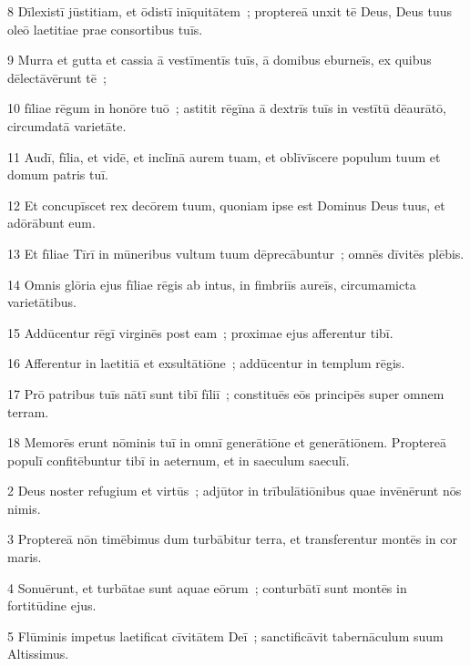 \psalmVerse
  {\phantom{00}8}
  {Dīlexistī jūstitiam, et ōdistī inīquitātem~; proptereā unxit tē Deus, Deus tuus oleō laetitiae prae consortibus tuīs.}


\psalmVerse
  {\phantom{00}9}
  {Murra et gutta et cassia ā vestīmentīs tuīs, ā domibus eburneīs, ex quibus dēlectāvērunt tē~;}


\psalmVerse
  {\phantom{0}10}
  {fīliae rēgum in honōre tuō~; astitit rēgīna ā dextrīs tuīs in vestītū dēaurātō, circumdatā varietāte.}


\psalmVerse
  {\phantom{0}11}
  {Audī, fīlia, et vidē, et inclīnā aurem tuam, et oblīvīscere populum tuum et domum patris tuī.}


\psalmVerse
  {\phantom{0}12}
  {Et concupīscet rex decōrem tuum, quoniam ipse est Dominus Deus tuus, et adōrābunt eum.}


\psalmVerse
  {\phantom{0}13}
  {Et fīliae Tīrī in mūneribus vultum tuum dēprecābuntur~; omnēs dīvitēs plēbis.}


\psalmVerse
  {\phantom{0}14}
  {Omnis glōria ejus fīliae rēgis ab intus, in fimbriīs aureīs, circumamicta varietātibus.}


\psalmVerse
  {\phantom{0}15}
  {Addūcentur rēgī virginēs post eam~; proximae ejus afferentur tibī.}


\psalmVerse
  {\phantom{0}16}
  {Afferentur in laetitiā et exsultātiōne~; addūcentur in templum rēgis.}


\psalmVerse
  {\phantom{0}17}
  {Prō patribus tuīs nātī sunt tibī fīliī~; constituēs eōs principēs super omnem terram.}


\psalmVerse
  {\phantom{0}18}
  {Memorēs erunt nōminis tuī in omnī generātiōne et generātiōnem. Proptereā populī confitēbuntur tibī in aeternum, et in saeculum saeculī.}



\psalmVerse
  {\phantom{00}2}
  {Deus noster refugium et virtūs~; adjūtor in trībulātiōnibus quae invēnērunt nōs nimis.}


\psalmVerse
  {\phantom{00}3}
  {Proptereā nōn timēbimus dum turbābitur terra, et transferentur montēs in cor maris.}


\psalmVerse
  {\phantom{00}4}
  {Sonuērunt, et turbātae sunt aquae eōrum~; conturbātī sunt montēs in fortitūdine ejus.}


\psalmVerse
  {\phantom{00}5}
  {Flūminis impetus laetificat cīvitātem Deī~; sanctificāvit tabernāculum suum Altissimus.}


